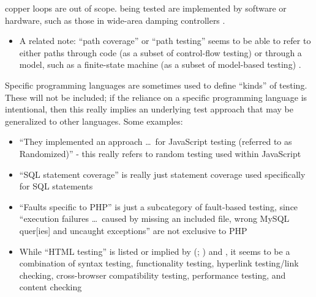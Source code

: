 \begin{enumerate}
{              copper loops \citep{Goralski1999} are out of scope.} being
          tested are implemented by software or hardware, such as those in
          wide-area damping controllers \citep{PierreEtAl2017, TrudnowskiEtAl2017}.
          \begin{itemize}
              \item A related note: ``path coverage'' or ``path testing''
                    seems to be able to refer to either paths through code
                    (as a subset of control-flow testing)
                    \citep[p.~5-13]{SWEBOK2024} or through a model, such as
                    a finite-state machine (as a subset of model-based
                    testing) \citep[p.~184]{DoğanEtAl2014}.
          \end{itemize}
          \fi
\end{enumerate}

\ifnotpaper
    Specific programming languages are sometimes used to define ``kinds'' of
    testing. These will not be included; if the reliance
    on a specific programming language is intentional, then this really implies an
    underlying test approach that may be generalized to other languages. Some
    examples:

    \begin{itemize}
        \item ``They implemented an approach \dots\ for JavaScript testing
              (referred to as Randomized)'' \citep[p.~192]{DoğanEtAl2014} -
              this really refers to random testing used within JavaScript
        \item ``SQL statement coverage'' is really just statement coverage
              used specifically for SQL statements \citep[Tab.~13]{DoğanEtAl2014}
        \item ``Faults specific to PHP'' is just a subcategory of fault-based
              testing, since ``execution failures \dots\ caused by missing an
              included file, wrong MySQL quer[ies] and uncaught exceptions''
              are not exclusive to PHP \citep[Tab.~27]{DoğanEtAl2014}
        \item While ``HTML testing'' is listed or implied by
              \citeauthor{Gerrard2000a} (\citeyear[Tab.~2]{Gerrard2000a};
              \citeyear[Tab.~1, p.~3]{Gerrard2000b}) and
              \citet[p.~220]{Patton2006}, it seems to be a combination of syntax
              testing, functionality testing, hyperlink testing/link checking,
              cross-browser compatibility testing, performance testing, and
              content checking \citep[p.~3]{Gerrard2000b}
    \end{itemize}

